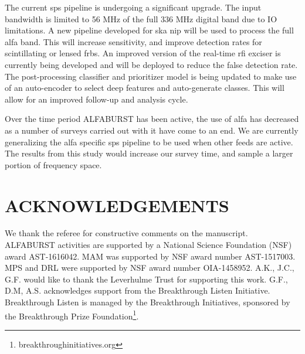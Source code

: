 \documentclass[a4paper,fleqn,usenatbib]{mnras}
\begin{document}
The current \gls{sps} pipeline is undergoing a significant upgrade. The input
bandwidth is limited to 56 MHz of the full 336 MHz digital band due to IO
limitations. A new pipeline developed for \gls{ska} \gls{nip} will be used to
process the full \gls{alfa} band.  This will increase sensitivity, and improve
detection rates for scintillating or lensed \glspl{frb}.  An improved version
of the real-time \gls{rfi} exciser is currently being developed and will be
deployed to reduce the false detection rate. The post-processing classifier and
prioritizer model is being updated to make use of an auto-encoder to select
deep features and auto-generate classes. This will allow for an improved
follow-up and analysis cycle.

Over the time period ALFABURST has been active, the use of \gls{alfa} has
decreased as a number of surveys carried out with it have come to an end. We
are currently generalizing the \gls{alfa} specific \gls{sps} pipeline to be
used when other feeds are active. The results from this study would increase
our survey time, and sample a larger portion of frequency space. 

\section*{ACKNOWLEDGEMENTS}

We thank the referee for constructive comments on the manuscript. ALFABURST
activities are supported by a National Science Foundation (NSF) award
AST-1616042.  MAM was supported by NSF award number AST-1517003. MPS and DRL
were supported by NSF award number OIA-1458952.  A.K., J.C., G.F. would like to
thank the Leverhulme Trust for supporting this work.  G.F., D.M, A.S.
acknowledges support from the Breakthrough Listen Initiative. Breakthrough
Listen is managed by the Breakthrough Initiatives, sponsored by the Breakthrough
Prize Foundation\footnote{breakthroughinitiatives.org}.
 

 

\bsp	%
\label{lastpage}
\end{document}
